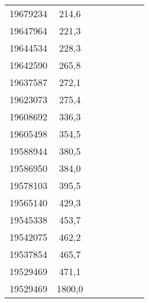 \documentclass[11pt]{article}
\begin{document}
{{\begin{tabular}{|c|c|c|c|c|c|c|c|}
            19679234 & 214,6 &  &  &  &  &  & \tabularnewline
            \cline{1-2} 
            19647964 & 221,3 &  &  &  &  &  & \tabularnewline
            \cline{1-2} 
            19644534 & 228,3 &  &  &  &  &  & \tabularnewline
            \cline{1-2} 
            19642590 & 265,8 &  &  &  &  &  & \tabularnewline
            \cline{1-2} 
            19637587 & 272,1 &  &  &  &  &  & \tabularnewline
            \cline{1-2} 
            19623073 & 275,4 &  &  &  &  &  & \tabularnewline
            \cline{1-2} 
            19608692 & 336,3 &  &  &  &  &  & \tabularnewline
            \cline{1-2} 
            19605498 & 354,5 &  &  &  &  &  & \tabularnewline
            \cline{1-2} 
            19588944 & 380,5 &  &  &  &  &  & \tabularnewline
            \cline{1-2} 
            19586950 & 384,0 &  &  &  &  &  & \tabularnewline
            \cline{1-2} 
            19578103 & 395,5 &  &  &  &  &  & \tabularnewline
            \cline{1-2} 
            19565140 & 429,3 &  &  &  &  &  & \tabularnewline
            \cline{1-2} 
            19545338 & 453,7 &  &  &  &  &  & \tabularnewline
            \cline{1-2} 
            19542075 & 462,2 &  &  &  &  &  & \tabularnewline
            \cline{1-2} 
            19537854 & 465,7 &  &  &  &  &  & \tabularnewline
            \cline{1-2} 
            19529469 & 471,1 &  &  &  &  &  & \tabularnewline
            \cline{1-2} 
            19529469 & 1800,0 &  &  &  &  &  & \tabularnewline
            \cline{1-2} 
        \end{tabular}
    }
}
\vspace*{\fill}
\end{document}
